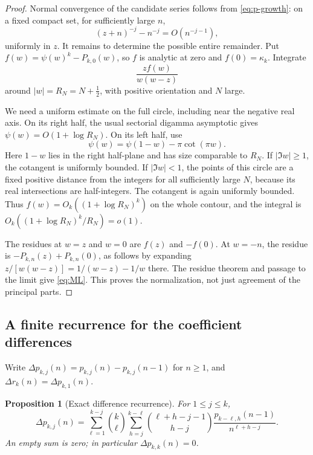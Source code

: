 \documentclass[11pt,a4paper]{article}
\numberwithin{equation}{section}
\newtheorem{proposition}[theorem]{Proposition}
\theoremstyle{definition}
\theoremstyle{remark}
\begin{document}
\begin{proof}
Normal convergence of the candidate series follows from
\eqref{eq:p-growth}: on a fixed compact set, for sufficiently large $n$,
\[
 (z+n)^{-j}-n^{-j}=O(n^{-j-1}),
\]
uniformly in $z$.  It remains to determine the possible entire
remainder.  Put $f(w)=\psi(w)^k-P_{k,0}(w)$, so $f$ is analytic at
zero and $f(0)=\kappa_k$.  Integrate
\[
                  \frac{zf(w)}{w(w-z)}
\]
around $|w|=R_N=N+\tfrac12$, with positive orientation and $N$ large.

We need a uniform estimate on the full circle, including near the
negative real axis.  On its right half, the usual sectorial digamma
asymptotic gives $\psi(w)=O(1+\log R_N)$.  On its left half, use
\begin{equation}
             \psi(w)=\psi(1-w)-\pi\cot(\pi w).
 \label{eq:reflection}
\end{equation}
Here $1-w$ lies in the right half-plane and has size comparable to
$R_N$.  If $|\Im w|\ge1$, the cotangent is uniformly bounded.  If
$|\Im w|<1$, the points of this circle are a fixed positive distance
from the integers for all sufficiently large $N$, because its real
intersections are half-integers.  The cotangent is again uniformly
bounded.  Thus $f(w)=O_k((1+\log R_N)^k)$ on the whole contour, and
the integral is $O_k((1+\log R_N)^k/R_N)=o(1)$.

The residues at $w=z$ and $w=0$ are $f(z)$ and $-f(0)$.
At $w=-n$, the residue is
$-P_{k,n}(z)+P_{k,n}(0)$, as follows by expanding
$z/[w(w-z)]=1/(w-z)-1/w$ there.  The residue theorem and passage to
the limit give \eqref{eq:ML}.  This proves the normalization, not just
agreement of the principal parts.
\end{proof}

\subsection{A finite recurrence for the coefficient differences}

Write $\Delta p_{k,j}(n)=p_{k,j}(n)-p_{k,j}(n-1)$ for $n\ge1$,
and $\Delta r_k(n)=\Delta p_{k,1}(n)$.

\begin{proposition}[Exact difference recurrence]
\label{prop:difference}
For $1\le j\le k$,
\begin{equation}
 \Delta p_{k,j}(n)=
 \sum_{\ell=1}^{k-j}\binom{k}{\ell}
 \sum_{h=j}^{k-\ell}
       \binom{\ell+h-j-1}{h-j}
       \frac{p_{k-\ell,h}(n-1)}{n^{\ell+h-j}}.
 \label{eq:difference}
\end{equation}
An empty sum is zero; in particular $\Delta p_{k,k}(n)=0$.
\end{proposition}
\end{document}
